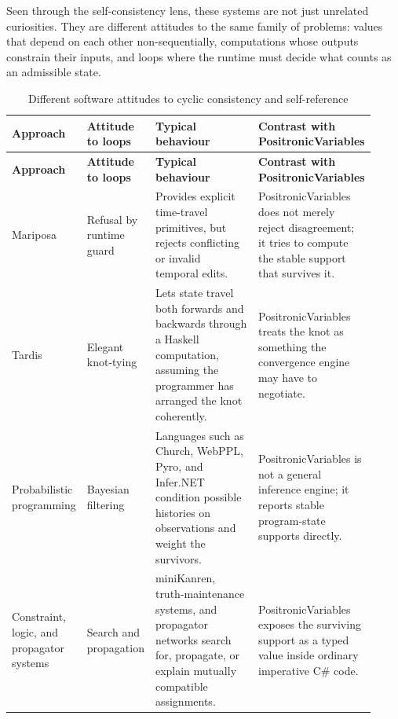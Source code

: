\documentclass[a4paper,11pt]{article}
\begin{document}
Seen through the self-consistency lens, these systems are not just unrelated
curiosities. They are different attitudes to the same family of problems: values that
depend on each other non-sequentially, computations whose outputs constrain their
inputs, and loops where the runtime must decide what counts as an admissible state.

\begingroup
\small
\setlength{\LTleft}{0pt}
\setlength{\LTright}{0pt}
\begin{longtable}{@{}
  >{\raggedright\arraybackslash}p{0.16\linewidth}
  >{\raggedright\arraybackslash}p{0.18\linewidth}
  >{\raggedright\arraybackslash}p{0.30\linewidth}
  >{\raggedright\arraybackslash}p{0.28\linewidth}
@{}}
  \caption{Different software attitudes to cyclic consistency and self-reference}\label{tab:attitudes-to-paradox}\\
  \toprule
  \textbf{Approach} &
  \textbf{Attitude to loops} &
  \textbf{Typical behaviour} &
  \textbf{Contrast with PositronicVariables} \\
  \midrule
  \endfirsthead
  \toprule
  \textbf{Approach} &
  \textbf{Attitude to loops} &
  \textbf{Typical behaviour} &
  \textbf{Contrast with PositronicVariables} \\
  \midrule
  \endhead
    Mariposa &
    Refusal by runtime guard &
    Provides explicit time-travel primitives, but rejects conflicting or invalid
    temporal edits.\parencite{MariposaGitHub} &
    PositronicVariables does not merely reject disagreement; it tries to compute
    the stable support that survives it. \\

    Tardis &
    Elegant knot-tying &
    Lets state travel both forwards and backwards through a Haskell computation,
    assuming the programmer has arranged the knot coherently.\parencite{TardisHackage} &
    PositronicVariables treats the knot as something the convergence engine may
    have to negotiate. \\

    Probabilistic programming &
    Bayesian filtering &
    Languages such as Church, WebPPL, Pyro, and Infer.NET condition possible
    histories on observations and weight the survivors.\parencite{Church2008,Goodman14WebPPL,Goo19,Mic251} &
    PositronicVariables is not a general inference engine; it reports stable
    program-state supports directly. \\

    Constraint, logic, and propagator systems &
    Search and propagation &
    miniKanren, truth-maintenance systems, and propagator networks search for,
    propagate, or explain mutually compatible assignments.\parencite{MiniKanren,Doyle79TMS,RadulSussman09} &
    PositronicVariables exposes the surviving support as a typed value inside
    ordinary imperative C\# code. \\


\end{longtable}
\end{document}
